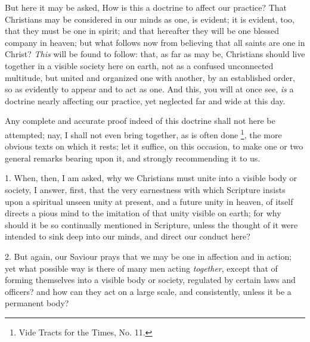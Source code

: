 But here it may be asked, How is this a doctrine to affect our
practice? That Christians may be considered in our minds as one, is
evident; it is evident, too, that they must be one in spirit; and that
hereafter they will be one blessed company in heaven; but what follows
now from believing that all saints are one in Christ? \emph{This} will
be found to follow: that, as far as may be, Christians should live
together in a visible society here on earth, not as a confused
unconnected multitude, but united and organized one with another, by
an established order, so as evidently to appear and to act as one. And
this, you will at once see, \emph{is} a doctrine nearly affecting our
practice, yet neglected far and wide at this day.

Any complete and accurate proof indeed of this doctrine shall not
here be attempted; nay, I shall not even bring together, as is often
done \footnote{Vide Tracts for the Times, No. 11.}, the more obvious
texts on which it rests; let it suffice, on this occasion, to make one
or two general remarks bearing upon it, and strongly recommending it
to us.

1. When, then, I am asked, why we Christians must unite into a
visible body or society, I answer, first, that the very earnestness
with which Scripture insists upon a spiritual unseen unity at present,
and a future unity in heaven, of itself directs a pious mind to the
imitation of that unity visible on earth; for why should it be so
continually mentioned in Scripture, unless the thought of it were
intended to sink deep into our minds, and direct our conduct here?

2. But again, our Saviour prays that we may be one in affection and
in action; yet what possible way is there of many men acting \emph{together},
except that of forming themselves into a visible body or society,
regulated by certain laws and officers? and how can they act on a
large scale, and consistently, unless it be a permanent body?

